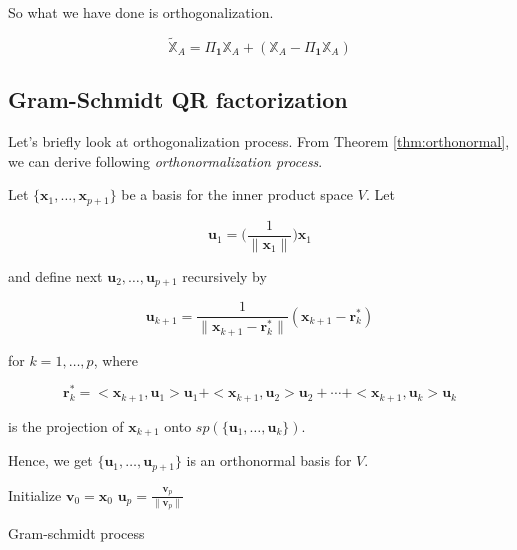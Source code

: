 \documentclass[]{book}
\theoremstyle{definition}
\theoremstyle{definition}
\theoremstyle{definition}
\theoremstyle{remark}
\let\BeginKnitrBlock\begin \let\EndKnitrBlock\end
\begin{document}
So what we have done is orthogonalization.

\[\tilde{\mathbb{X}}_A = \Pi_{\mathbf{1}}\mathbb{X}_A + (\mathbb{X}_A - \Pi_{\mathbf{1}}\mathbb{X}_A)\]

\hypertarget{gram-schmidt-qr-factorization}{%
\subsection{Gram-Schmidt QR factorization}\label{gram-schmidt-qr-factorization}}

Let's briefly look at orthogonalization process. From Theorem \ref{thm:orthonormal}, we can derive following \emph{orthonormalization process}.

\BeginKnitrBlock{theorem}[Gram-Schmidt Process]
\protect\hypertarget{thm:gs}{}{\label{thm:gs} {} }Let \(\{ \mathbf{x}_1, \ldots, \mathbf{x}_{p + 1} \}\) be a basis for the inner product space \(V\). Let

\[\mathbf{u}_1 = \bigg( \frac{1}{\lVert \mathbf{x}_1 \rVert} \bigg) \mathbf{x}_1\]

and define next \(\mathbf{u}_2, \ldots, \mathbf{u}_{p + 1}\) recursively by

\[\mathbf{u}_{k + 1} = \frac{1}{\lVert \mathbf{x}_{k + 1} - \mathbf{r}_k^{*} \rVert}(\mathbf{x}_{k + 1} - \mathbf{r}_k^{*})\]

for \(k = 1, \ldots, p\), where

\[\mathbf{r}_k^{*} = <\mathbf{x}_{k + 1}, \mathbf{u}_1> \mathbf{u}_1 + <\mathbf{x}_{k + 1}, \mathbf{u}_2 >\mathbf{u}_2 + \cdots + < \mathbf{x}_{k + 1}, \mathbf{u}_k > \mathbf{u}_k\]

is the projection of \(\mathbf{x}_{k + 1}\) onto \(sp(\{ \mathbf{u}_1, \ldots, \mathbf{u}_k \})\).

Hence, we get \(\{ \mathbf{u}_1, \ldots, \mathbf{u}_{p + 1} \}\) is an orthonormal basis for \(V\).
\EndKnitrBlock{theorem}

\begin{algorithm} \label{alg:alggs}
  \SetAlgoLined
  Initialize $\mathbf{v}_0 = \mathbf{x}_0$\;
  $\mathbf{u}_p = \frac{\mathbf{v}_p}{\lVert \mathbf{v}_p \rVert}$
  \caption{Gram-schmidt process}
\end{algorithm}
\end{document}
